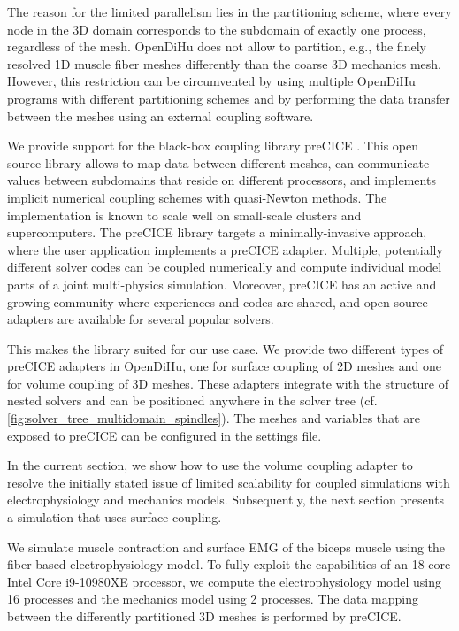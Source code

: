 The reason for the limited parallelism lies in the partitioning scheme, where every node in the 3D domain corresponds to the subdomain of exactly one process, regardless of the mesh. OpenDiHu does not allow to partition, e.g., the finely resolved 1D muscle fiber meshes differently than the coarse 3D mechanics mesh. However, this restriction can be circumvented by using multiple OpenDiHu programs with different partitioning schemes and by performing the data transfer between the meshes using an external coupling software.

We provide support for the black-box coupling library preCICE \cite{precice}. This open source library allows to map data between different meshes, can communicate values between subdomains that reside on different processors, and implements implicit numerical coupling schemes with quasi-Newton methods. The implementation is known to scale well on small-scale clusters and supercomputers.
The preCICE library targets a minimally-invasive approach, where the user application implements a preCICE adapter. Multiple, potentially different solver codes can be coupled numerically and compute individual model parts of a joint multi-physics simulation. Moreover, preCICE has an active and growing community where experiences and codes are shared, and open source adapters are available for several popular solvers.

This makes the library suited for our use case. We provide two different types of preCICE adapters in OpenDiHu, one for surface coupling of 2D meshes and one for volume coupling of 3D meshes. These adapters integrate with the structure of nested solvers and can be positioned anywhere in the solver tree (cf. \cref{fig:solver_tree_multidomain_spindles}). The meshes and variables that are exposed to preCICE can be configured in the settings file.

In the current section, we show how to use the volume coupling adapter to resolve the initially stated issue of limited scalability for coupled simulations with electrophysiology and mechanics models. Subsequently, the next section presents a simulation that uses surface coupling.

We simulate muscle contraction and surface EMG of the biceps muscle using the fiber based electrophysiology model. To fully exploit the  capabilities of an 18-core Intel Core i9-10980XE processor, we compute the electrophysiology model using 16 processes and the mechanics model using 2 processes. The data mapping between the differently partitioned 3D meshes is performed by preCICE.

